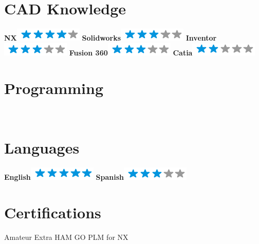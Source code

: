 \documentclass[]{friggeri-cv}
\begin{document}
\begin{aside}
    \section{CAD Knowledge}
    \textbf{NX}\includegraphics[scale=0.40]{img/4stars.png}
    \textbf{Solidworks}\includegraphics[scale=0.40]{img/3stars.png}
    \textbf{Inventor}\includegraphics[scale=0.40]{img/3stars.png}
    \textbf{Fusion 360}\includegraphics[scale=0.40]{img/3stars.png}
    \textbf{Catia}\includegraphics[scale=0.40]{img/2stars.png}
    ~
    \section{Programming}
    ~
    \section{Languages}
    \textbf{English}\includegraphics[scale=0.40]{img/5stars.png}
    \textbf{Spanish}\includegraphics[scale=0.40]{img/3stars.png}
    ~
    \section{Certifications}
    Amateur Extra HAM
    GO PLM for NX
    ~
\end{aside}
\end{document}
